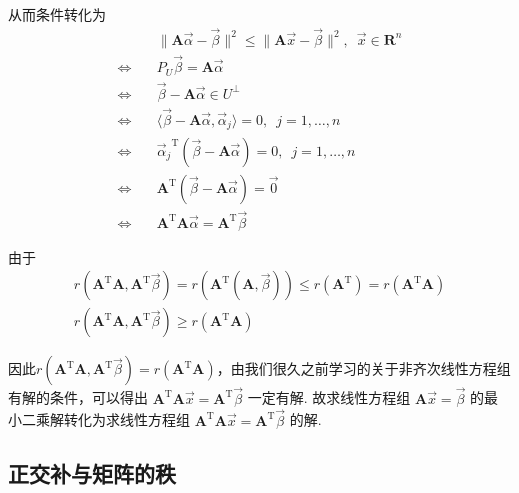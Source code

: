 从而条件转化为
\begin{align*}
               & \lVert \mathbf{A}\vec{\alpha} - \vec{\beta} \rVert^{2} \leqslant \lVert \mathbf{A}\vec{x} - \vec{\beta} \rVert^{2}, \enspace \vec{x} \in \mathbf{R}^{n} \\
    \iff \quad & P_U \vec{\beta} = \mathbf{A}\vec{\alpha}                                                                                                                \\
    \iff \quad & \vec{\beta} - \mathbf{A}\vec{\alpha} \in U^{\perp}                                                                                                      \\
    \iff \quad & \langle \vec{\beta} - \mathbf{A}\vec{\alpha}, \vec{\alpha} _j \rangle = 0, \enspace j = 1, \ldots , n                                                   \\
    \iff \quad & {\vec{\alpha} _j}^{\mathrm{T}}(\vec{\beta} - \mathbf{A}\vec{\alpha}) = 0, \enspace j = 1, \ldots , n                                                    \\
    \iff \quad & \mathbf{A}^{\mathrm{T}}(\vec{\beta} - \mathbf{A}\vec{\alpha}) = \vec{0}                                                                                 \\
    \iff \quad & \mathbf{A}^{\mathrm{T}}\mathbf{A}\vec{\alpha} = \mathbf{A}^{\mathrm{T}}\vec{\beta}
\end{align*}

由于
\begin{gather*}
    r(\mathbf{A}^{\mathrm{T}}\mathbf{A}, \mathbf{A}^{\mathrm{T}}\vec{\beta})= r (\mathbf{A}^{\mathrm{T}}(\mathbf{A}, \vec{\beta})) \leqslant r(\mathbf{A}^{\mathrm{T}}) = r(\mathbf{A}^{\mathrm{T}}\mathbf{A}) \\
    r(\mathbf{A}^{\mathrm{T}}\mathbf{A}, \mathbf{A}^{\mathrm{T}}\vec{\beta}) \geqslant r(\mathbf{A}^{\mathrm{T}}\mathbf{A})
\end{gather*}

因此$r(\mathbf{A}^{\mathrm{T}}\mathbf{A}, \mathbf{A}^{\mathrm{T}}\vec{\beta}) = r(\mathbf{A}^{\mathrm{T}}\mathbf{A})$，由我们很久之前学习的关于非齐次线性方程组有解的条件，可以得出 $ \mathbf{A}^{\mathrm{T}}\mathbf{A}\vec{x} = \mathbf{A}^{\mathrm{T}}\vec{\beta}$ 一定有解. 故求线性方程组 $\mathbf{A}\vec{x} = \vec{\beta}$ 的最小二乘解转化为求线性方程组 $ \mathbf{A}^{\mathrm{T}}\mathbf{A}\vec{x} = \mathbf{A}^{\mathrm{T}}\vec{\beta}$ 的解.

\subsection{正交补与矩阵的秩}

